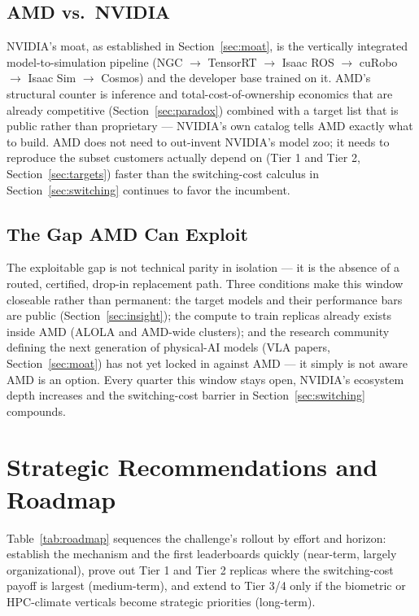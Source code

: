 \documentclass[blind]{gtac}
\begin{document}
\subsection{AMD vs.\ NVIDIA}
NVIDIA's moat, as established in Section~\ref{sec:moat}, is the vertically integrated model-to-simulation pipeline (NGC $\rightarrow$ TensorRT $\rightarrow$ Isaac ROS $\rightarrow$ cuRobo $\rightarrow$ Isaac Sim $\rightarrow$ Cosmos) and the developer base trained on it. AMD's structural counter is inference and total-cost-of-ownership economics that are already competitive (Section~\ref{sec:paradox}) combined with a target list that is public rather than proprietary --- NVIDIA's own catalog tells AMD exactly what to build. AMD does not need to out-invent NVIDIA's model zoo; it needs to reproduce the subset customers actually depend on (Tier 1 and Tier 2, Section~\ref{sec:targets}) faster than the switching-cost calculus in Section~\ref{sec:switching} continues to favor the incumbent.

\subsection{The Gap AMD Can Exploit}
The exploitable gap is not technical parity in isolation --- it is the absence of a routed, certified, drop-in replacement path. Three conditions make this window closeable rather than permanent: the target models and their performance bars are public (Section~\ref{sec:insight}); the compute to train replicas already exists inside AMD (ALOLA and AMD-wide clusters); and the research community defining the next generation of physical-AI models (VLA papers, Section~\ref{sec:moat}) has not yet locked in against AMD --- it simply is not aware AMD is an option. Every quarter this window stays open, NVIDIA's ecosystem depth increases and the switching-cost barrier in Section~\ref{sec:switching} compounds.

\section{Strategic Recommendations and Roadmap}
\label{sec:reco}

Table~\ref{tab:roadmap} sequences the challenge's rollout by effort and horizon: establish the mechanism and the first leaderboards quickly (near-term, largely organizational), prove out Tier 1 and Tier 2 replicas where the switching-cost payoff is largest (medium-term), and extend to Tier 3/4 only if the biometric or HPC-climate verticals become strategic priorities (long-term).
\end{document}
